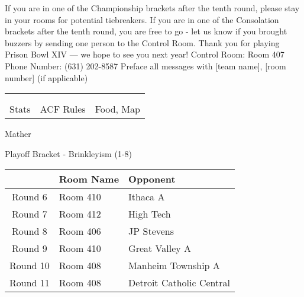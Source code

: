 \documentclass{article}%
\begin{document}
\vspace*{30pt}%
\linebreak%
If you are in one of the Championship brackets after the tenth round, please stay in your rooms for potential tiebreakers.\newline%
\newline%
If you are in one of the Consolation brackets after the tenth round, you are free to go {-} let us know if you brought buzzers by sending one person to the Control Room.\newline%
\newline%
Thank you for playing Prison Bowl XIV — we hope to see you next year!\newline%
\newline%
Control Room: Room 407\newline%
Phone Number: (631) 202{-}8587\newline%
Preface all messages with {[}team name{]}, {[}room number{]} (if applicable)%
\vspace*{30pt}%
\newline%
%
\begin{tabularx}{\textwidth}{YYY}%
  &  &  \\%
\\%
Stats&ACF Rules&Food, Map\\%
\end{tabularx}%
\newpage%
\begin{center}%
\begin{Huge}%
Mather%
\end{Huge}%
\vspace*{12pt}%
\linebreak%
\begin{Large}%
Playoff Bracket {-} Brinkleyism (1{-}8)%
\end{Large}%
\end{center}%
\vspace*{4pt}%
%
\begin{tabularx}{\textwidth}{|c|Y|Y|}%
\hline%
&Room Name&Opponent\\%
\hline%
Round 6&Room 410&Ithaca A\\%
Round 7&Room 412&High Tech\\%
Round 8&Room 406&JP Stevens\\%
Round 9&Room 410&Great Valley A\\%
Round 10&Room 408&Manheim Township A\\%
Round 11&Room 408&Detroit Catholic Central\\%
\hline%
\end{tabularx}%
\end{document}
